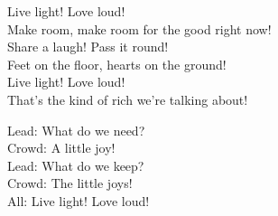\begin{lyrics}
Live light! Love loud!\\
Make room, make room for the good right now!\\
Share a laugh! Pass it round!\\
Feet on the floor, hearts on the ground!\\
Live light! Love loud!\\
That’s the kind of rich we’re talking about!

Lead: What do we need?\\
Crowd: A little joy!\\
Lead: What do we keep?\\
Crowd: The little joys!\\
All: Live light! Love loud!
\end{lyrics}

